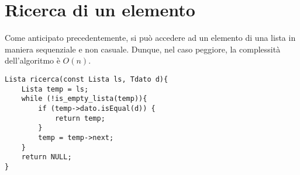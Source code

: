 \section{Ricerca di un elemento}
Come anticipato precedentemente, si può accedere ad un elemento di una lista in maniera sequenziale e non casuale. Dunque, nel caso peggiore, la complessità dell'algoritmo è $O(n)$.
\begin{lstlisting}[title={Ricerca di un elemento di una lista semplicemente/doppiamente concatenata}]
Lista ricerca(const Lista ls, Tdato d){
    Lista temp = ls;
    while (!is_empty_lista(temp)){
        if (temp->dato.isEqual(d)) {
            return temp;
        }
        temp = temp->next;
    }
    return NULL;
}
\end{lstlisting}


	
